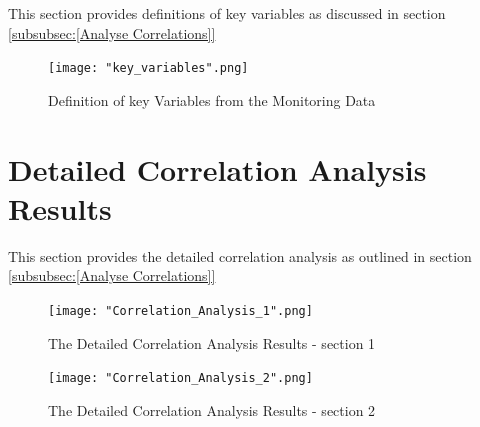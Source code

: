 \documentclass[12pt]{scrartcl}
\begin{document}
This section provides definitions of key variables as discussed in section \ref{subsubsec:[Analyse Correlations]}

\begin{figure}[h]
  \caption{Definition of key Variables from the Monitoring Data}
  \label{fig:key_variables}
  \centering
    \texttt{[image: "key\_variables".png]}
\end{figure} 


\section{Detailed Correlation Analysis Results}
\label{sec:[Correlation Analysis Results]}
This section provides the detailed correlation analysis as outlined in section \ref{subsubsec:[Analyse Correlations]}





\begin{figure}[h]
  \caption{The Detailed Correlation Analysis Results - section 1}
  \label{fig:Correlation_Analysis_1}
  \centering
    \texttt{[image: "Correlation\_Analysis\_1".png]}
\end{figure} 

\begin{figure}[h]
  \caption{The Detailed Correlation Analysis Results - section 2}
  \label{fig:Correlation_Analysis_2}
  \centering
    \texttt{[image: "Correlation\_Analysis\_2".png]}
\end{figure} 
\end{document}
